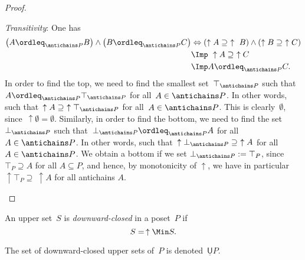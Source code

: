 \begin{proof}
\begin{compactitem}
        \item \emph{Transitivity}: One has
        \begin{equation}
            \begin{aligned}
                \left(A\ordleq_{\antichains P} B\right) \wedge \left(B\ordleq_{\antichains P} C\right)&\Leftrightarrow  \left(\uparrow A \supseteq \ \uparrow \ B\right) \wedge \left( \uparrow  B\supseteq \ \uparrow C\right)\\
                &\Imp \ \uparrow A\supseteq \ \uparrow C\\
                &\Imp A\ordleq_{\antichains P}C.
            \end{aligned}
        \end{equation}
        In order to find the top, we need to find the smallest set~$\top_{\antichains P}$ such that~$A\ordleq_{\antichains P} \top_{\antichains P}$ for all~$A\in \antichains P$. In other words, such that~$\uparrow A\supseteq \ \uparrow \top_{\antichains P}$ for all~$A\in \antichains P$. This is clearly~$\emptyset$, since~$\uparrow \emptyset = \emptyset$. Similarly, in order to find the bottom, we need to find the set~$\bot_{\antichains P}$ such that~$\bot_{\antichains P} \ordleq_{\antichains P} A$ for all~$A\in \antichains P$. In other words, such that~$\uparrow \bot_{\antichains P} \supseteq \ \uparrow A$ for all~$A\in \antichains P$. We obtain a bottom if we set $\bot_{\antichains P} := \top_P$, since $\top_P \supseteq A$ for all $A \subseteq P$, and hence, by monotonicity of $\uparrow$, we have in particular $\uparrow \top_P \supseteq \ \uparrow A$ for all antichains $A$.
    \end{compactitem}
\end{proof}



\begin{definition}
    \label{def:downward-closed-upperset}
    An upper set~$S$ is \emph{downward-closed} in a poset~$P$ if
    \begin{equation}
        S =\, \uparrow \Min S.
    \end{equation}
\end{definition}

\begin{remark}
    The set of downward-closed upper sets of~$P$ is denoted~$\underline{\mathsf{U}}P$.
\end{remark}


